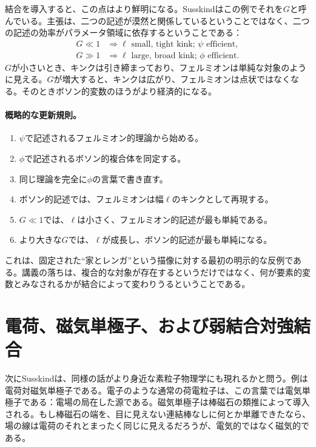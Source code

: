 結合を導入すると、この点はより鮮明になる。Susskindはこの例でそれを\(G\)と呼んでいる。主張は、二つの記述が漠然と関係しているということではなく、二つの記述の効率がパラメータ領域に依存するということである：
\begin{align}
G \ll 1
&\Rightarrow
\ell\text{ small, tight kink; }\psi\text{ efficient},\\
G \gg 1
&\Rightarrow
\ell\text{ large, broad kink; }\phi\text{ efficient}.
\end{align}
\(G\)が小さいとき、キンクは引き締まっており、フェルミオンは単純な対象のように見える。\(G\)が増大すると、キンクは広がり、フェルミオンは点状ではなくなる。そのときボソン的変数のほうがより経済的になる。

\paragraph{概略的な更新規則。}
\begin{enumerate}
\item \(\psi\)で記述されるフェルミオン的理論から始める。
\item \(\phi\)で記述されるボソン的複合体を同定する。
\item 同じ理論を完全に\(\phi\)の言葉で書き直す。
\item ボソン的記述では、フェルミオンは幅\(\ell\)のキンクとして再現する。
\item \(G\ll 1\)では、\(\ell\)は小さく、フェルミオン的記述が最も単純である。
\item より大きな\(G\)では、\(\ell\)が成長し、ボソン的記述が最も単純になる。
\end{enumerate}

これは、固定された``家とレンガ''という描像に対する最初の明示的な反例である。講義の落ちは、複合的な対象が存在するというだけではなく、何が要素的変数とみなされるかが結合によって変わりうるということである。

\section{電荷、磁気単極子、および弱結合対強結合}

次にSusskindは、同様の話がより身近な素粒子物理学にも現れるかと問う。例は電荷対磁気単極子である。電子のような通常の荷電粒子は、この言葉では電気単極子である：電場の局在した源である。磁気単極子は棒磁石の類推によって導入される。もし棒磁石の端を、目に見えない連結棒なしに何とか単離できたなら、場の線は電荷のそれとまったく同じに見えるだろうが、電気的ではなく磁気的である。

